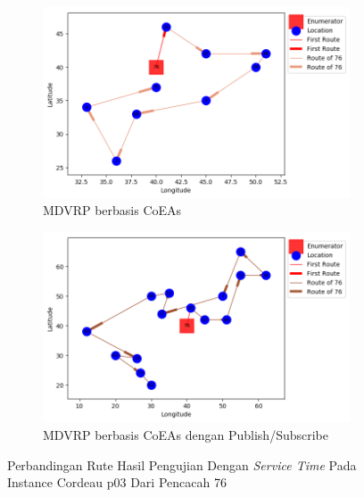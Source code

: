 \begin{figure}[H]
	\centering
	\begin{subfigure}[t]{\textwidth}
		\centering
		\includegraphics[width=\textwidth]{Resources/Images/cordeau_p03_tw/cordeau_p03_tw_76_coes}
		\caption{MDVRP berbasis CoEAs}
		\label{fig:cordeau_p03_tw_76_coes}
	\end{subfigure}
	\begin{subfigure}[t]{\textwidth}
		\centering
		\includegraphics[width=\textwidth]{Resources/Images/cordeau_p03_tw/cordeau_p03_tw_76_pubsub_coes}
		\caption{MDVRP berbasis CoEAs dengan Publish/Subscribe}
		\label{fig:cordeau_p03_tw_76_pubsub_coes}
	\end{subfigure}
	\caption{Perbandingan Rute Hasil Pengujian Dengan \textit{Service Time} Pada Instance Cordeau p03 Dari Pencacah 76}
	\label{fig:cordeau_p03_tw_76}
\end{figure}


